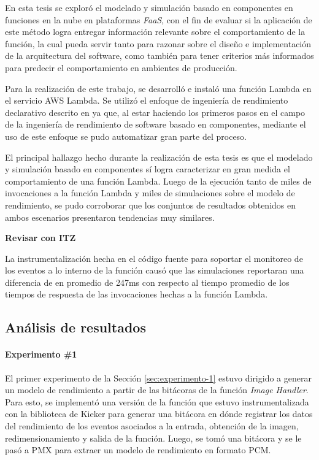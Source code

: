 En esta tesis se exploró el modelado y simulación basado en componentes en funciones en la nube en plataformas \emph{FaaS}, con el fin de evaluar si la aplicación de este método logra entregar información relevante sobre el comportamiento de la función, la cual pueda servir tanto para razonar sobre el diseño e implementación de la arquitectura del software, como también para tener criterios más informados para predecir el comportamiento en ambientes de producción.

Para la realización de este trabajo, se desarrolló e instaló una función Lambda en el servicio AWS Lambda.  Se utilizó el enfoque de ingeniería de rendimiento declarativo descrito en \cite{Walter:2018:TDP:3185768.3185777} ya que, al estar haciendo los primeros pasos en el campo de la ingeniería de rendimiento de software basado en componentes, mediante el uso de este enfoque se pudo automatizar gran parte del proceso.

El principal hallazgo hecho durante la realización de esta tesis es que el modelado y simulación basado en componentes sí logra caracterizar en gran medida el comportamiento de una función Lambda. Luego de la ejecución tanto de miles de invocaciones a la función Lambda y miles de simulaciones sobre el modelo de rendimiento, se pudo corroborar que los conjuntos de resultados obtenidos en ambos escenarios presentaron tendencias muy similares. 

\textbf{Revisar con ITZ}


La instrumentalización hecha en el código fuente para soportar el monitoreo de los eventos a lo interno de la función causó que las simulaciones reportaran una diferencia de en promedio de 247ms con respecto al tiempo promedio de los tiempos de respuesta de las invocaciones hechas a la función Lambda.

\subsection{Análisis de resultados}
\paragraph{Experimento \#1} El primer experimento de la Sección \ref{sec:experimento-1} estuvo dirigido a generar un modelo de rendimiento a partir de las bitácoras de la función \emph{Image Handler}. Para esto, se implementó una versión de la función que estuvo instrumentalizada con la biblioteca de Kieker para generar una bitácora en dónde registrar los datos del rendimiento de los eventos asociados a la entrada, obtención de la imagen, redimensionamiento y salida de la función. Luego, se tomó una bitácora y se le pasó a PMX para extraer un modelo de rendimiento en formato PCM. 

